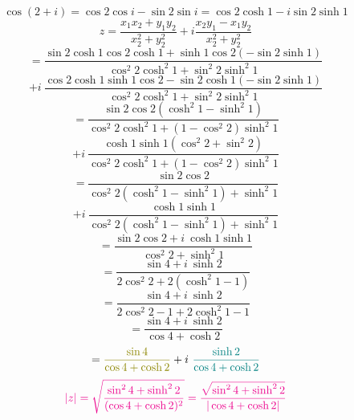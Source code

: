 \documentclass[14pt]{extarticle}
\begin{document}
\begin{displaymath}
    \cos(2+i) = \cos2\cos i - \sin2 \sin i = 
    \cos 2 \cosh 1 - i \sin2 \sinh 1
\end{displaymath}
\begin{displaymath}
    z= \frac{x_1x_2+y_1y_2}{x_2^2+y_2^2} + i \frac{x_2y_1-x_1y_2}{x_2^2+y_2^2}
\end{displaymath}
\begin{displaymath}
    = \frac{\sin 2 \cosh 1 \cos 2 \cosh 1 + \sinh 1 \cos 2 (-\sin2 \sinh 1)}
    {\cos^2 2 \cosh^2 1 + \sin^2 2 \sinh^2 1}
\end{displaymath}
\begin{displaymath}
    + i \ \frac{\cos 2 \cosh 1 \sinh 1 \cos 2 - \sin 2 \cosh 1 (-\sin2 \sinh 1)}
    {\cos^2 2 \cosh^2 1 + \sin^2 2 \sinh^2 1}
\end{displaymath}
\begin{displaymath}
    = \frac{\sin 2 \cos 2 (\cosh^2 1 - \sinh^2 1)}
    {\cos^2 2 \cosh^2 1 + (1 - \cos^2 2) \sinh^2 1}
\end{displaymath}
\begin{displaymath}
    + i \ \frac{\cosh 1 \sinh 1(\cos^2 2 + \sin^2 2)}
    {\cos^2 2 \cosh^2 1 + (1 - \cos^2 2) \sinh^2 1}
\end{displaymath}
\begin{displaymath}
    = \frac{\sin 2 \cos 2}
    {\cos^2 2 (\cosh^2 1 - \sinh^2 1)+\sinh^2 1}
\end{displaymath}
\begin{displaymath}
    + i \ \frac{\cosh 1 \sinh 1}
    {\cos^2 2 (\cosh^2 1 - \sinh^2 1)+\sinh^2 1}
\end{displaymath}
\begin{displaymath}
    = \frac{\sin 2 \cos 2 + i \ \cosh 1 \sinh 1}
    {\cos^2 2 +\sinh^2 1}
\end{displaymath}
\begin{displaymath}
    = \frac{\sin 4 + i \ \sinh 2}
    {2\cos^2 2 +2(\cosh^2 1-1)}
\end{displaymath}
\begin{displaymath}
    = \frac{\sin 4 + i \ \sinh 2}
    {2\cos^2 2 -1 +2\cosh^2 1-1}
\end{displaymath}
\begin{displaymath}
    = \frac{\sin 4 + i \ \sinh 2}
    {\cos4 + \cosh 2}
\end{displaymath}
\begin{displaymath}
    = \textcolor{olive}{\frac{\sin 4}{\cos4 + \cosh 2}}
    +i \ \textcolor{teal}{\frac{ \sinh 2}{\cos4 + \cosh 2}}
\end{displaymath}
\begin{displaymath}
    \color{magenta}|z|=\sqrt{\frac{\sin^2 4+\sinh^2 2}{(\cos4 + \cosh 2)^2}}=
    \frac{\sqrt{\sin^2 4+\sinh^2 2}}{|\cos4 + \cosh 2|}
\end{displaymath}
\end{document}
